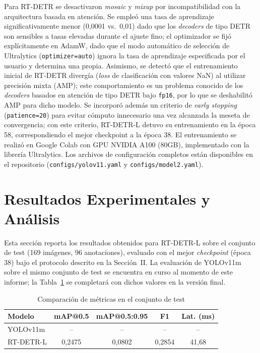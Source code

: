 \documentclass[conference]{IEEEtran}
\begin{document}
Para RT-DETR se desactivaron \textit{mosaic} y \textit{mixup} por incompatibilidad
con la arquitectura basada en atención. Se empleó una tasa de aprendizaje
significativamente menor (0,0001 vs.\ 0,01) dado que los \textit{decoders} de tipo
DETR son sensibles a tasas elevadas durante el ajuste fino; el optimizador se fijó
explícitamente en AdamW, dado que el modo automático de selección de Ultralytics
(\texttt{optimizer=auto}) ignora la tasa de aprendizaje especificada por el usuario
y determina una propia. Asimismo, se detectó que el entrenamiento inicial de
RT-DETR divergía (\textit{loss} de clasificación con valores NaN) al utilizar
precisión mixta (AMP); este comportamiento es un problema conocido de los
\textit{decoders} basados en atención de tipo DETR bajo \texttt{fp16}, por lo que
se deshabilitó AMP para dicho modelo. Se incorporó además un criterio de
\textit{early stopping} (\texttt{patience=20}) para evitar cómputo innecesario una
vez alcanzada la meseta de convergencia; con este criterio, RT-DETR-L detuvo su
entrenamiento en la época 58, correspondiendo el mejor checkpoint a la época 38.
El entrenamiento se realizó en Google Colab con GPU NVIDIA A100 (80GB),
implementado con la librería Ultralytics. Los archivos de configuración completos
están disponibles en el repositorio (\texttt{configs/yolov11.yaml} y
\texttt{configs/model2.yaml}).

\section{Resultados Experimentales y Análisis}

Esta sección reporta los resultados obtenidos para RT-DETR-L sobre el conjunto de
test (169 imágenes, 96 anotaciones), evaluado con el mejor \textit{checkpoint}
(época 38) bajo el protocolo descrito en la Sección~II. La evaluación de YOLOv11m
sobre el mismo conjunto de test se encuentra en curso al momento de este informe;
la Tabla~\ref{tab:results} se completará con dichos valores en la versión final.

\begin{table}[htbp]
\caption{Comparación de métricas en el conjunto de test}
\label{tab:results}
\begin{center}
\begin{tabular}{lcccc}
\toprule
\textbf{Modelo} & \textbf{mAP@0.5} & \textbf{mAP@0.5:0.95} & \textbf{F1} & \textbf{Lat. (ms)} \\
\midrule
YOLOv11m  & -- & -- & -- & -- \\
RT-DETR-L & 0{,}2475 & 0{,}0802 & 0{,}2854 & 41{,}68 \\
\bottomrule
\end{tabular}
\end{center}
\end{table}
\end{document}
